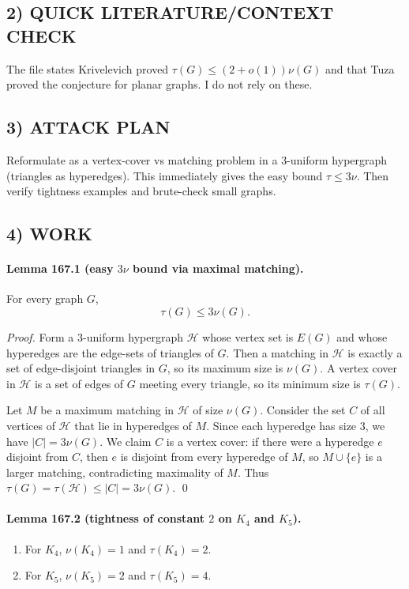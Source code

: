 \subsection*{2) QUICK LITERATURE/CONTEXT CHECK}
The file states Krivelevich proved $\tau(G)\le (2+o(1))\nu(G)$ and that Tuza proved the conjecture for planar graphs. I do not rely on these.

\subsection*{3) ATTACK PLAN}
Reformulate as a vertex-cover vs matching problem in a $3$-uniform hypergraph (triangles as hyperedges). This immediately gives the easy bound $\tau\le 3\nu$. Then verify tightness examples and brute-check small graphs.

\subsection*{4) WORK}
\paragraph{Lemma 167.1 (easy $3\nu$ bound via maximal matching).}
For every graph $G$,
\[
\tau(G)\le 3\nu(G).
\]

\textit{Proof.}
Form a $3$-uniform hypergraph $\mathcal H$ whose vertex set is $E(G)$ and whose hyperedges are the edge-sets of triangles of $G$.
Then a matching in $\mathcal H$ is exactly a set of edge-disjoint triangles in $G$, so its maximum size is $\nu(G)$.
A vertex cover in $\mathcal H$ is a set of edges of $G$ meeting every triangle, so its minimum size is $\tau(G)$.

Let $M$ be a maximum matching in $\mathcal H$ of size $\nu(G)$. Consider the set $C$ of all vertices of $\mathcal H$ that lie in hyperedges of $M$. Since each hyperedge has size $3$, we have $|C|=3\nu(G)$.
We claim $C$ is a vertex cover: if there were a hyperedge $e$ disjoint from $C$, then $e$ is disjoint from every hyperedge of $M$, so $M\cup\{e\}$ is a larger matching, contradicting maximality of $M$.
Thus $\tau(G)=\tau(\mathcal H)\le |C|=3\nu(G)$. \qed

\paragraph{Lemma 167.2 (tightness of constant $2$ on $K_4$ and $K_5$).}
\begin{enumerate}
\item For $K_4$, $\nu(K_4)=1$ and $\tau(K_4)=2$.
\item For $K_5$, $\nu(K_5)=2$ and $\tau(K_5)=4$.
\end{enumerate}

